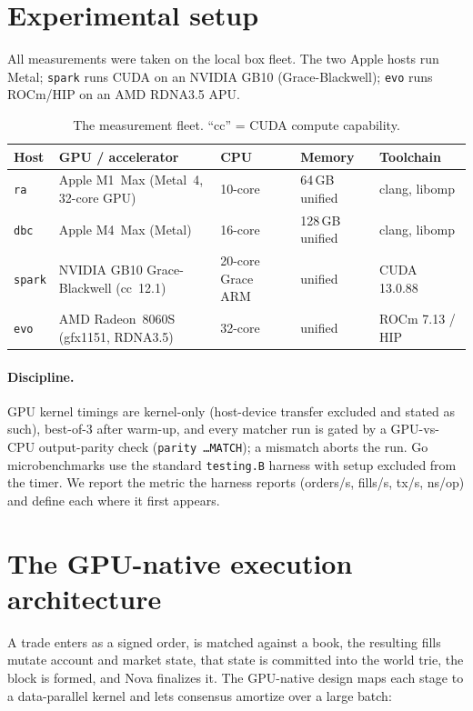 \documentclass[11pt,a4paper]{article}
\begin{document}
\section{Experimental setup}\label{sec:setup}

All measurements were taken on the local box fleet. The two Apple hosts
run Metal; \texttt{spark} runs CUDA on an NVIDIA GB10 (Grace-Blackwell);
\texttt{evo} runs ROCm/HIP on an AMD RDNA3.5 APU.

\begin{table}[h]\centering\small
\begin{tabular}{@{}lllll@{}}
\toprule
Host & GPU / accelerator & CPU & Memory & Toolchain \\
\midrule
\texttt{ra}    & Apple M1~Max (Metal~4, 32-core GPU) & 10-core & 64\,GB unified  & clang, libomp \\
\texttt{dbc}   & Apple M4~Max (Metal)                & 16-core & 128\,GB unified & clang, libomp \\
\texttt{spark} & NVIDIA GB10 Grace-Blackwell (cc~12.1) & 20-core Grace ARM & unified & CUDA 13.0.88 \\
\texttt{evo}   & AMD Radeon~8060S (gfx1151, RDNA3.5) & 32-core & unified & ROCm 7.13 / HIP \\
\bottomrule
\end{tabular}
\caption{The measurement fleet. ``cc'' = CUDA compute capability.}
\end{table}

\paragraph{Discipline.} GPU kernel timings are kernel-only (host-device
transfer excluded and stated as such), best-of-3 after warm-up, and
every matcher run is gated by a GPU-vs-CPU output-parity check
(\texttt{parity \ldots MATCH}); a mismatch aborts the run. Go
microbenchmarks use the standard \texttt{testing.B} harness with setup
excluded from the timer. We report the metric the harness reports
(orders/s, fills/s, tx/s, ns/op) and define each where it first appears.

\section{The GPU-native execution architecture}\label{sec:arch}

A trade enters as a signed order, is matched against a book, the
resulting fills mutate account and market state, that state is committed
into the world trie, the block is formed, and Nova finalizes it. The
GPU-native design maps each stage to a data-parallel kernel and lets
consensus amortize over a large batch:
\end{document}
